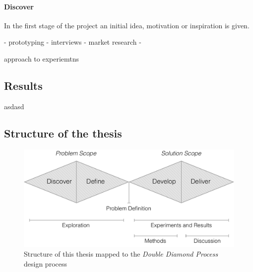 \paragraph{Discover}
\label{par:Discover}

In the first stage of the project an initial idea, motivation or inspiration is given.

- prototyping
- interviews
- market research
-

approach to experiemtns



\subsection{Results}

asdasd

\subsection{Structure of the thesis}

\begin{figure}[h]
    \centering
    \includegraphics[width=\textwidth]{img/double-diamond-with-structure}
    \caption{Structure of this thesis mapped to the \emph{Double Diamond Process} design process }
\label{fig:double-diamond-with-structure}
\end{figure}

